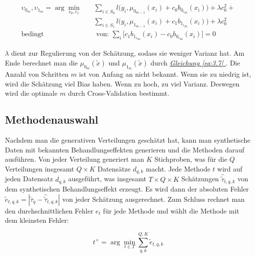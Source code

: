 \documentclass[12pt,a4paper,twoside]{scrartcl}
\numberwithin{equation}{section}
\renewcommand*{\refeq}[1]{\emph{\hyperref[#1]{Gleichung \ref*{#1} }}}
\begin{document}
\begin{equation}\label{eq:3.11}
\begin{split}
	\upsilon_{0_m},\upsilon_{1_m} = \arg\min_{c_0,c_1} \quad &\sum_{i \in S_0} l \big (y_i,\mu_{0_{m-1}}(x_i) + c_0  b_{{0_i}_m}(x_i) \big ) + \lambda c_0^2 + \\
 &\sum_{i \in S_1} l \big (y_i,\mu_{1_{m-1}}(x_i) + c_1  b_{{1_i}_m}(x_i) \big ) + \lambda c_0^2\\
  \text{bedingt}& \text{ von: } \sum_i \big [c_1 b_{{1_i}_m}(x_i) - c_0 b_{{0_i}_m}(x_i) \big ] = 0
\end{split}
\end{equation}
  	
\noindent
 $\lambda$ dient zur Regulierung von der Schätzung, sodass sie weniger Varianz hat. Am Ende berechnet man die $\mu_{0_m}(\tilde{x})$ und $\mu_{1_m}(\tilde{x})$ durch \refeq{eq:3.7}. Die Anzahl von Schritten $m$ ist von Anfang an nicht bekannt. Wenn sie zu niedrig ist, wird die Schätzung viel Bias haben. Wenn zu hoch, zu viel Varianz. Deswegen wird die optimale $m$ durch Cross-Validation bestimmt\cite{schuler2017synth}.\par
    	
\subsection{Methodenauswahl}\label{subsec:methodenauswahl}

Nachdem man die generativen Verteilungen geschätzt hat, kann man synthetische Daten mit bekannten Behandlungseffekten generieren und die Methoden darauf ausführen. Von jeder Verteilung generiert man $K$ Stichproben, was für die $Q$ Verteilungen  insgesamt $Q \times K$ Datensätze $d_{q,k}$ macht. Jede Methode $t$ wird auf jeden Datensatz $d_{q,k}$ ausgeführt, was insgesamt  $T \times Q \times K$ Schätzungen $\hat{\tilde{\tau}}_{t,q,k}$ von dem synthetischen Behandlungseffekt erzeugt. Es wird dann der absoluten Fehler $\tilde{e}_{t,q,k} = |\tilde{\tau}_q - \hat{\tilde{\tau}}_{t,q,k}|$ von jeder Schätzung  ausgerechnet. Zum Schluss rechnet man den durchschnittlichen Fehler $e_t$ für jede Methode und wählt die Methode mit dem kleinsten Fehler\cite{schuler2017synth}:\par

\begin{equation}\label{eq:3.12}
 t^{\times} = \arg\min_{t \in T} \sum_{q,k}^{Q,K} \tilde{e}_{t,q,k}
\end{equation}
\clearpage
\end{document}

